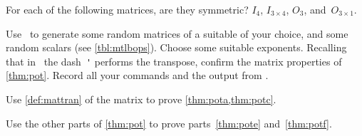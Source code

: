 \begin{exercise}  
For each of the following matrices, are they symmetric? 
\(I_4\), \(I_{3\times4}\), \(O_3\), and~\(O_{3\times1}\).
\end{exercise}




\begin{exercise}  
Use \script\ to generate some random matrices of a suitable  of your choice, and some random scalars (see \autoref{tbl:mtlbops}).
Choose some suitable exponents.
Recalling that in \script\ the dash~\verb|'| performs the transpose, confirm the matrix  properties of \autoref{thm:pot}.
Record all your commands and the output from \script.
\end{exercise}


\begin{exercise}  
Use \autoref{def:mattran} of the matrix  to prove \cref{thm:pota,thm:potc}.
\end{exercise}

\begin{exercise}  
Use the other parts of \autoref{thm:pot} to prove parts~\ref{thm:pote} and~\ref{thm:potf}.
\end{exercise}


